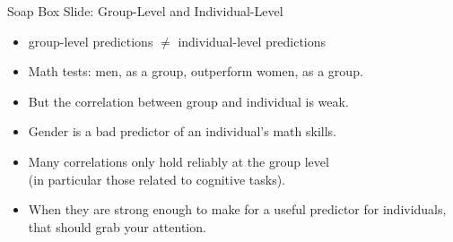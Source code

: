 \documentclass[professionalfonts, xcolor={usenames,svgnames,x11names,table}]{beamer}
\begin{document}
\begin{frame}{Soap Box Slide: Group-Level and Individual-Level} 
    \begin{itemize}
        \item group-level predictions $\neq$ individual-level predictions
    \end{itemize}
    \begin{example}
        \begin{itemize}
            \item Math tests: men, as a group, outperform women, as a group.
            \item But the correlation between group and individual is weak.
            \item Gender is a bad predictor of an individual's math skills.
        \end{itemize}
    \end{example}
    \begin{itemize}
        \item Many correlations only hold reliably at the group level\\
            (in particular those related to cognitive tasks).
        \item When they are strong enough to make for a useful predictor for individuals, that should grab your attention.
    \end{itemize}
\end{frame}
\end{document}
